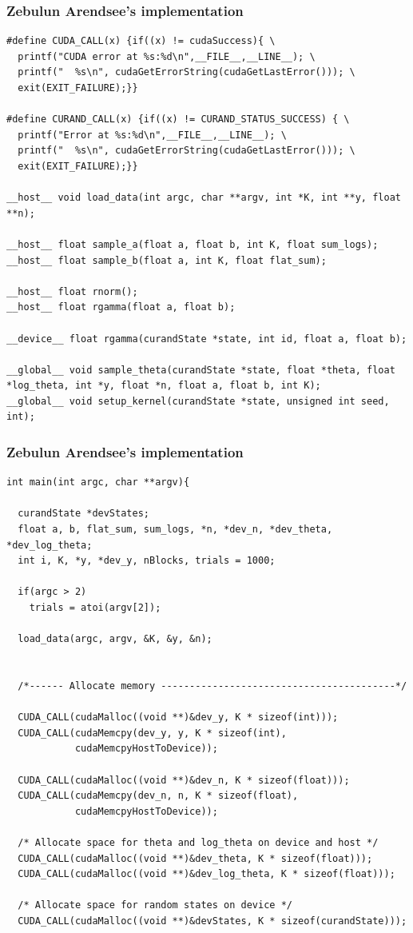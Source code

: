 \documentclass[handout]{beamer}
\numberwithin{equation}{section}
\begin{document}
\begin{frame}[fragile]
\frametitle{Zebulun Arendsee's implementation}
\begin{lstlisting}[name=mc]
#define CUDA_CALL(x) {if((x) != cudaSuccess){ \
  printf("CUDA error at %s:%d\n",__FILE__,__LINE__); \
  printf("  %s\n", cudaGetErrorString(cudaGetLastError())); \
  exit(EXIT_FAILURE);}} 

#define CURAND_CALL(x) {if((x) != CURAND_STATUS_SUCCESS) { \
  printf("Error at %s:%d\n",__FILE__,__LINE__); \
  printf("  %s\n", cudaGetErrorString(cudaGetLastError())); \
  exit(EXIT_FAILURE);}}

__host__ void load_data(int argc, char **argv, int *K, int **y, float **n);

__host__ float sample_a(float a, float b, int K, float sum_logs);
__host__ float sample_b(float a, int K, float flat_sum);

__host__ float rnorm();
__host__ float rgamma(float a, float b);

__device__ float rgamma(curandState *state, int id, float a, float b);

__global__ void sample_theta(curandState *state, float *theta, float *log_theta, int *y, float *n, float a, float b, int K);
__global__ void setup_kernel(curandState *state, unsigned int seed, int);
\end{lstlisting}
\end{frame}

\begin{frame}[fragile]
\frametitle{Zebulun Arendsee's implementation}
\begin{lstlisting}[name=mc]
int main(int argc, char **argv){

  curandState *devStates;
  float a, b, flat_sum, sum_logs, *n, *dev_n, *dev_theta, *dev_log_theta;
  int i, K, *y, *dev_y, nBlocks, trials = 1000;

  if(argc > 2)
    trials = atoi(argv[2]);

  load_data(argc, argv, &K, &y, &n);


  /*------ Allocate memory -----------------------------------------*/

  CUDA_CALL(cudaMalloc((void **)&dev_y, K * sizeof(int)));
  CUDA_CALL(cudaMemcpy(dev_y, y, K * sizeof(int), 
            cudaMemcpyHostToDevice));

  CUDA_CALL(cudaMalloc((void **)&dev_n, K * sizeof(float)));
  CUDA_CALL(cudaMemcpy(dev_n, n, K * sizeof(float), 
            cudaMemcpyHostToDevice));

  /* Allocate space for theta and log_theta on device and host */
  CUDA_CALL(cudaMalloc((void **)&dev_theta, K * sizeof(float)));
  CUDA_CALL(cudaMalloc((void **)&dev_log_theta, K * sizeof(float)));

  /* Allocate space for random states on device */
  CUDA_CALL(cudaMalloc((void **)&devStates, K * sizeof(curandState)));
\end{lstlisting}
\end{frame}
\end{document}
